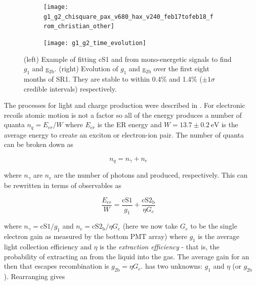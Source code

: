 \begin{figure}
    \begin{subfigure}[t]{0.4\textwidth}
        \texttt{[image: g1\_g2\_chisquare\_pax\_v680\_hax\_v240\_feb17tofeb18\_from\_christian\_other]}
    \end{subfigure}%
    \begin{subfigure}[t]{0.65\textwidth}
        \texttt{[image: g1\_g2\_time\_evolution]}
    \end{subfigure}
    \caption{(left) Example of fitting cS1 and \cstwob from mono-energetic signals to find $g_1$ and g$_{2\mathrm{b}}$.  (right) Evolution
    of $g_1$ and g$_{2\mathrm{b}}$ over the first eight months of SR1.  They are stable to within 0.4\% and 1.4\% ($\pm 1 \sigma$ credible
    intervals) respectively.}
	\label{fig:calibrations_photon_charge_efficiences_g1_g2}
\end{figure}

The processes
for light and charge production were described in .  For electronic recoils atomic motion is
not a factor so all of the energy produces a number of quanta $n_q = E_{er} / W$ where $E_{er}$ is the ER energy and
$W = 13.7 \pm 0.2\ \mathrm{eV}$ is the average energy to create an exciton or electron-ion pair.  The number of quanta can be broken
down as

\begin{equation}
n_q = n_{\gamma} + n_e
\end{equation}

\noindent where $n_{\gamma}$ are $n_e$ are the number of photons and \electron produced, respectively.  This can be rewritten in terms of
observables as

\begin{equation}
\frac{E_{er}}{W} = \frac{\mathrm{cS1}}{g_1} + \frac{\mathrm{cS2_b}}{\eta G_e}
\label{eq:calibrations_s1_s2}
\end{equation}

\noindent where $n_{\gamma} = \mathrm{cS1} / g_1$ and $n_e = \mathrm{cS2_b} / \eta G_e$ (here we now take $G_e$ to be the single electron
gain as measured by the bottom PMT array) where $g_1$ is the average light collection
efficiency and $\eta$
is the \textit{extraction efficiency} - that is, the probability of extracting an \electron from the liquid into the gas.  The average
gain for an \electron then that escapes recombination is $g_{2 \mathrm{b}} = \eta G_e$.   has two unknowns:
$g_1$ and $\eta$ (or $g_{2 \mathrm{b}}$).  Rearranging gives

